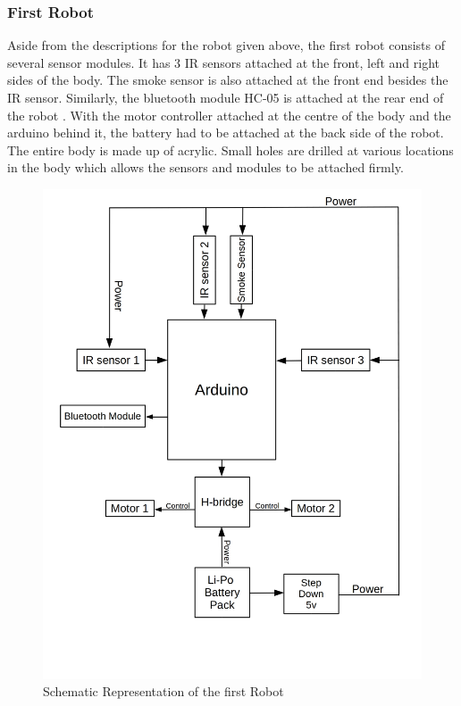 \subsubsection{First Robot}
Aside from the descriptions for the robot given above, the first robot consists of several sensor modules. It has 3 IR sensors attached at the front, left and right sides of the body. The smoke sensor is also attached at the front end besides the IR sensor. Similarly, the bluetooth module HC-05 is attached at the rear end of the robot . With the motor controller attached at the centre of the body and the arduino behind it, the battery had to be attached at the back side of the robot.\\
The entire body is made up of acrylic. Small holes are drilled at various locations in the body which allows the sensors and modules to be attached firmly. 
\newpage
\begin{figure}[h]
\center
\includegraphics[scale=0.25]{bot1new.jpg} 
\caption{Schematic Representation of the first Robot}
 \end{figure}
